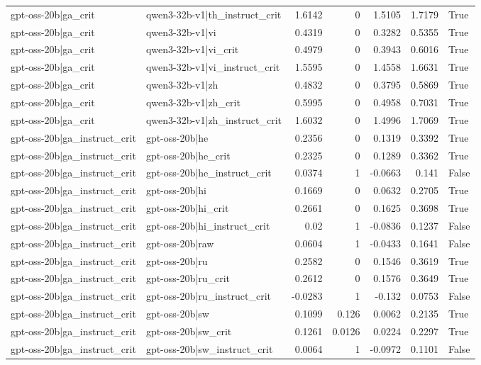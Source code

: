 \begin{table}
\begin{tabular}{l l r r r r l}
gpt-oss-20b|ga_crit & qwen3-32b-v1|th_instruct_crit & 1.6142 & 0 & 1.5105 & 1.7179 & True \\
gpt-oss-20b|ga_crit & qwen3-32b-v1|vi & 0.4319 & 0 & 0.3282 & 0.5355 & True \\
gpt-oss-20b|ga_crit & qwen3-32b-v1|vi_crit & 0.4979 & 0 & 0.3943 & 0.6016 & True \\
gpt-oss-20b|ga_crit & qwen3-32b-v1|vi_instruct_crit & 1.5595 & 0 & 1.4558 & 1.6631 & True \\
gpt-oss-20b|ga_crit & qwen3-32b-v1|zh & 0.4832 & 0 & 0.3795 & 0.5869 & True \\
gpt-oss-20b|ga_crit & qwen3-32b-v1|zh_crit & 0.5995 & 0 & 0.4958 & 0.7031 & True \\
gpt-oss-20b|ga_crit & qwen3-32b-v1|zh_instruct_crit & 1.6032 & 0 & 1.4996 & 1.7069 & True \\
gpt-oss-20b|ga_instruct_crit & gpt-oss-20b|he & 0.2356 & 0 & 0.1319 & 0.3392 & True \\
gpt-oss-20b|ga_instruct_crit & gpt-oss-20b|he_crit & 0.2325 & 0 & 0.1289 & 0.3362 & True \\
gpt-oss-20b|ga_instruct_crit & gpt-oss-20b|he_instruct_crit & 0.0374 & 1 & -0.0663 & 0.141 & False \\
gpt-oss-20b|ga_instruct_crit & gpt-oss-20b|hi & 0.1669 & 0 & 0.0632 & 0.2705 & True \\
gpt-oss-20b|ga_instruct_crit & gpt-oss-20b|hi_crit & 0.2661 & 0 & 0.1625 & 0.3698 & True \\
gpt-oss-20b|ga_instruct_crit & gpt-oss-20b|hi_instruct_crit & 0.02 & 1 & -0.0836 & 0.1237 & False \\
gpt-oss-20b|ga_instruct_crit & gpt-oss-20b|raw & 0.0604 & 1 & -0.0433 & 0.1641 & False \\
gpt-oss-20b|ga_instruct_crit & gpt-oss-20b|ru & 0.2582 & 0 & 0.1546 & 0.3619 & True \\
gpt-oss-20b|ga_instruct_crit & gpt-oss-20b|ru_crit & 0.2612 & 0 & 0.1576 & 0.3649 & True \\
gpt-oss-20b|ga_instruct_crit & gpt-oss-20b|ru_instruct_crit & -0.0283 & 1 & -0.132 & 0.0753 & False \\
gpt-oss-20b|ga_instruct_crit & gpt-oss-20b|sw & 0.1099 & 0.126 & 0.0062 & 0.2135 & True \\
gpt-oss-20b|ga_instruct_crit & gpt-oss-20b|sw_crit & 0.1261 & 0.0126 & 0.0224 & 0.2297 & True \\
gpt-oss-20b|ga_instruct_crit & gpt-oss-20b|sw_instruct_crit & 0.0064 & 1 & -0.0972 & 0.1101 & False \\

\end{tabular}
\end{table}
